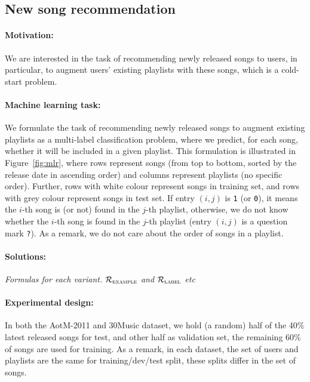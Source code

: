 \subsection{New song recommendation}
\label{ssec:newsongrec}

\paragraph{Motivation:} 
We are interested in the task of recommending newly released songs to users,
in particular, to augment users' existing playlists with these songs,
which is a cold-start problem.

\paragraph{Machine learning task:}
We formulate the task of recommending newly released songs to augment existing playlists
as a multi-label classification problem, where we predict, for each song, 
whether it will be included in a given playlist.
This formulation is illustrated in Figure~\ref{fig:mlr},
where rows represent songs (from top to bottom, sorted by the release date in ascending order)
and columns represent playlists (no specific order).
Further, rows with white colour represent songs in training set, and rows with grey colour represent songs in test set.
If entry $(i, j)$ is \texttt{1} (or \texttt{0}), it means the $i$-th song is (or not) found in the $j$-th playlist,
otherwise, we do not know whether the $i$-th song is found in the $j$-th playlist (\ie entry $(i, j)$ is a question mark \texttt{?}).
As a remark, we do not care about the order of songs in a playlist.



\paragraph{Solutions:}
{\it Formulas for each variant. $\mathcal{R}_\textsc{example}$ and $\mathcal{R}_\textsc{label}$ etc}


\paragraph{Experimental design:}
In both the AotM-2011 and 30Music dataset, we hold (a random) half of the 40\% latest released songs for test,
and other half as validation set, the remaining 60\% of songs are used for training.
As a remark, in each dataset, the set of users and playlists are the same for training/dev/test split,
these splits differ in the set of songs.


